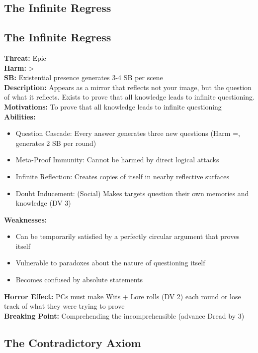 \documentclass[11pt]{article}
\newenvironment{monsterentry}[1]{%
  \begin{mdframed}[backgroundcolor=shadecolor, linewidth=0pt, leftmargin=0pt, rightmargin=0pt]%
  \subsection*{#1}%
}{%
  \end{mdframed}%
}
\begin{document}
\subsection{The Infinite Regress}

\begin{monsterentry}{The Infinite Regress}
\textbf{Threat:} Epic \\
\textbf{Harm:} \textgreater \\
\textbf{SB:} Existential presence generates 3-4 SB per scene \\
\textbf{Description:} Appears as a mirror that reflects not your image, but the question of what it reflects. Exists to prove that all knowledge leads to infinite questioning. \\
\textbf{Motivations:} To prove that all knowledge leads to infinite questioning \\
\textbf{Abilities:}
\begin{itemize}
\item Question Cascade: Every answer generates three new questions (Harm =, generates 2 SB per round)
\item Meta-Proof Immunity: Cannot be harmed by direct logical attacks
\item Infinite Reflection: Creates copies of itself in nearby reflective surfaces
\item Doubt Inducement: (Social) Makes targets question their own memories and knowledge (DV 3)
\end{itemize}
\textbf{Weaknesses:}
\begin{itemize}
\item Can be temporarily satisfied by a perfectly circular argument that proves itself
\item Vulnerable to paradoxes about the nature of questioning itself
\item Becomes confused by absolute statements
\end{itemize}
\textbf{Horror Effect:} PCs must make Wits + Lore rolls (DV 2) each round or lose track of what they were trying to prove \\
\textbf{Breaking Point:} Comprehending the incomprehensible (advance Dread by 3)
\end{monsterentry}

\subsection{The Contradictory Axiom}
\end{document}
